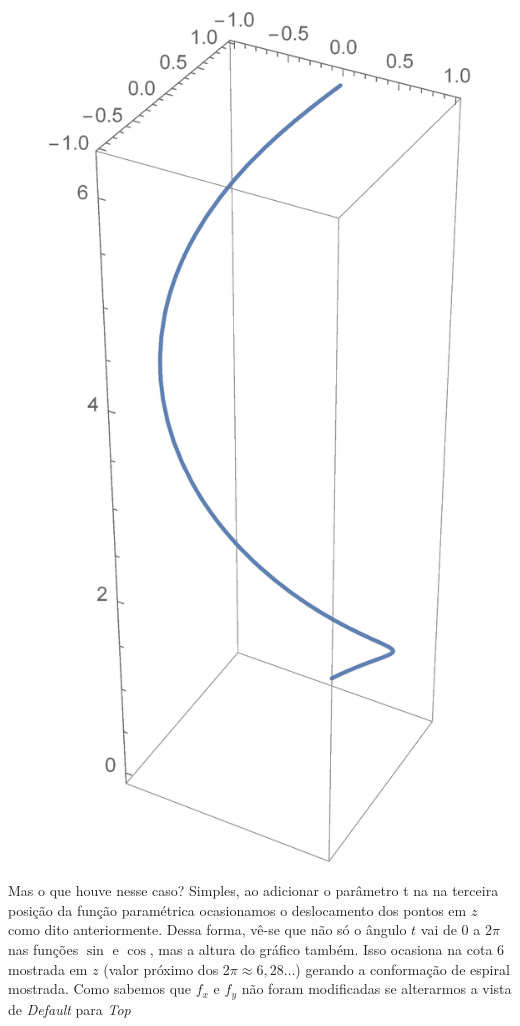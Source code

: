 \documentclass[a4paper, 12pt]{article}
\begin{document}
\begin{figure}[!h]
	\centering
	\includegraphics[scale=.5]{images/ParametricPlot3D}
\end{figure}

Mas o que houve nesse caso? Simples, ao adicionar o parâmetro t na na terceira posição da função paramétrica ocasionamos o deslocamento  dos pontos em $z$ como dito anteriormente. Dessa forma, vê-se que não só o ângulo $t$ vai de 0 a $2\pi$ nas funções $\sin$ e $\cos$, mas a altura do gráfico também. Isso ocasiona na cota 6 mostrada em $z$ (valor próximo dos 2$\pi\approx 6,\!28\ldots$) gerando a conformação de espiral mostrada. Como sabemos que $f_{x}$ e $f_{y}$ não foram modificadas se alterarmos a vista de \textit{Default} para \textit{Top}
\end{document}
